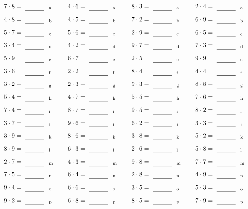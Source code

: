 \documentclass
[
  draft    = true,
  fontsize = 11pt,
  parskip  = half-
]
{scrartcl}
\begin{document}
\par\vfill\par
\begin{align*}
    \pline{7\cdot8}&=\rline{a}
  & \pline{4\cdot6}&=\rline{a}
  & \pline{8\cdot3}&=\rline{a}
  & \pline{2\cdot4}&=\rline{a} \\[1ex]
    \pline{4\cdot8}&=\rline{b}
  & \pline{4\cdot5}&=\rline{b}
  & \pline{7\cdot2}&=\rline{b}
  & \pline{6\cdot9}&=\rline{b} \\[1ex]
    \pline{5\cdot7}&=\rline{c}
  & \pline{5\cdot6}&=\rline{c}
  & \pline{2\cdot9}&=\rline{c}
  & \pline{6\cdot5}&=\rline{c} \\[1ex]
    \pline{3\cdot4}&=\rline{d}
  & \pline{4\cdot2}&=\rline{d}
  & \pline{9\cdot7}&=\rline{d}
  & \pline{7\cdot3}&=\rline{d} \\[1ex]
    \pline{5\cdot9}&=\rline{e}
  & \pline{6\cdot7}&=\rline{e}
  & \pline{2\cdot5}&=\rline{e}
  & \pline{9\cdot9}&=\rline{e} \\[1ex]
    \pline{3\cdot6}&=\rline{f}
  & \pline{2\cdot2}&=\rline{f}
  & \pline{8\cdot4}&=\rline{f}
  & \pline{4\cdot4}&=\rline{f} \\[1ex]
    \pline{3\cdot2}&=\rline{g}
  & \pline{2\cdot3}&=\rline{g}
  & \pline{9\cdot3}&=\rline{g}
  & \pline{8\cdot8}&=\rline{g} \\[1ex]
    \pline{5\cdot4}&=\rline{h}
  & \pline{4\cdot7}&=\rline{h}
  & \pline{5\cdot5}&=\rline{h}
  & \pline{7\cdot6}&=\rline{h} \\[1ex]
    \pline{7\cdot4}&=\rline{i}
  & \pline{8\cdot7}&=\rline{i}
  & \pline{9\cdot5}&=\rline{i}
  & \pline{8\cdot2}&=\rline{i} \\[1ex]
    \pline{3\cdot7}&=\rline{j}
  & \pline{9\cdot6}&=\rline{j}
  & \pline{6\cdot2}&=\rline{j}
  & \pline{3\cdot3}&=\rline{j} \\[1ex]
    \pline{3\cdot9}&=\rline{k}
  & \pline{8\cdot6}&=\rline{k}
  & \pline{3\cdot8}&=\rline{k}
  & \pline{5\cdot2}&=\rline{k} \\[1ex]
    \pline{8\cdot9}&=\rline{l}
  & \pline{6\cdot3}&=\rline{l}
  & \pline{2\cdot6}&=\rline{l}
  & \pline{5\cdot8}&=\rline{l} \\[1ex]
    \pline{2\cdot7}&=\rline{m}
  & \pline{4\cdot3}&=\rline{m}
  & \pline{9\cdot8}&=\rline{m}
  & \pline{7\cdot7}&=\rline{m} \\[1ex]
    \pline{7\cdot5}&=\rline{n}
  & \pline{6\cdot4}&=\rline{n}
  & \pline{2\cdot8}&=\rline{n}
  & \pline{4\cdot9}&=\rline{n} \\[1ex]
    \pline{9\cdot4}&=\rline{o}
  & \pline{6\cdot6}&=\rline{o}
  & \pline{3\cdot5}&=\rline{o}
  & \pline{5\cdot3}&=\rline{o} \\[1ex]
    \pline{9\cdot2}&=\rline{p}
  & \pline{6\cdot8}&=\rline{p}
  & \pline{8\cdot5}&=\rline{p}
  & \pline{7\cdot9}&=\rline{p}
\end{align*}
\end{document}
